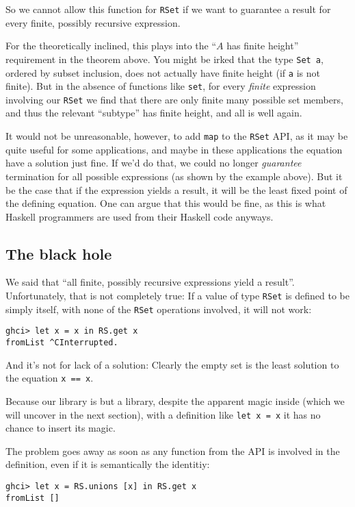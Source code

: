 \documentclass[manuscript,screen,acmsmall]{acmart}
\begin{document}
So we cannot allow this function for \verb|RSet| if we want to guarantee a result for every finite, possibly recursive expression.

For the theoretically inclined, this plays into the “$A$ has finite height” requirement in the theorem above. You might be irked that the type \verb|Set a|, ordered by subset inclusion, does not actually have finite height (if \verb|a| is not finite). But in the absence of functions like \verb|set|, for every \emph{finite} expression involving our \verb|RSet| we find that there are only finite many possible set members, and thus the relevant “subtype” has finite height, and all is well again.

It would not be unreasonable, however, to add \verb|map| to the \verb|RSet| API, as it may be quite useful for some applications, and maybe in these applications the equation have a solution just fine. If we'd do that, we could no longer \emph{guarantee} termination for all possible expressions (as shown by the example above). But it be the case that if the expression yields a result, it will be the least fixed point of the defining equation. One can argue that this would be fine, as this is what Haskell programmers are used from their Haskell code anyways.

\subsection{The black hole}

We said that “all finite, possibly recursive expressions yield a result”. Unfortunately, that is not completely true: If a value of type \verb|RSet| is defined to be simply itself, with none of the \verb|RSet| operations involved, it will not work:
\begin{verbatim}
ghci> let x = x in RS.get x
fromList ^CInterrupted.
\end{verbatim}
And it’s not for lack of a solution: Clearly the empty set is the least solution to the equation \verb|x == x|.

Because our library is but a library, despite the apparent magic inside (which we will uncover in the next section), with a definition like \verb|let x = x| it has no chance to insert its magic.

The problem goes away as soon as any function from the API is involved in the definition, even if it is semantically the identitiy:
\begin{verbatim}
ghci> let x = RS.unions [x] in RS.get x
fromList []
\end{verbatim}
\end{document}
